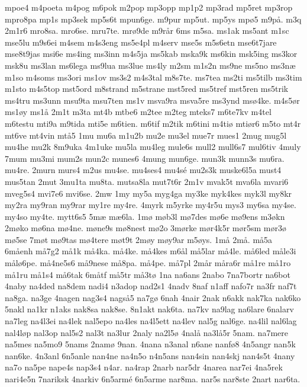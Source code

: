{mpoe4
m4poeta
m4pog
m6pok
m2pop
mp3opp
mp1p2
mp3rad
mp5ret
mp3rop
mpro8pa
mp1s
mp3sek
mp5s6t
mpun6ge.
m9pur
mp5ut.
mp5ys
mp^^f85
m9p^^e5.
m3q
2m1r6
mro8sa.
mro6se.
mru7te.
mr^^f89de
m9r^^e5r
6ms
m5sa.
ms1ak
ms5ant
m1sc
mse5lu
m9s6ei
m4sem
m4s3eng
ms5e4pl
m4serv
mse5s
m5s6etn
mse6t7jare
mse8t9jas
msi6e
ms4ing
ms3inn
m4s5ja
ms5kab
mska9k
ms6kin
msk5ing
ms3kor
msk8u
ms3lan
ms6lega
ms9lua
ms3lue
ms4ly
m2sm
m1s2n
ms9ne
ms5no
ms3n^^e6
m1so
m4soms
ms3ori
ms1ov
ms3s2
m4s3tal
m8s7te.
ms7tea
ms2ti
ms5tilb
ms3tim
m1sto
m4s5top
mst5ord
m8strand
m5strane
mst5red
ms5tref
mst5ren
ms5trik
ms4tru
ms3unn
msu9ta
msu7ten
ms1v
msva9ra
msva5re
ms3ynd
ms^^f84ke.
m4s5^^f8r
ms1^^f8y
ms1^^e5
2m1t
m3ta
mt4b
mtbe6
m2tee
m2teg
mteks7
m6te7kv
m4tel
m6testu
mti9a
m9tida
mti5e
m6tien.
m6tif
m2tik
m6tini
m4ti^^f8
mti^^f8r6
m5to
mt4r
mt6ve
mt4vin
mt^^e55
1mu
mu6a
m1u2b
mu2e
mu3el
mue7r
mues1
2mug
mug5l
mu4he
mu2k
8m9uka
4m1uke
mu5la
mu4leg
mule6s
mull2
mull6s7
mul6tiv
4muly
7mum
mu3mi
mum2s
mun2c
munes6
4mung
mun6ge.
mun3k
munn3s
mu6ra.
mu4re.
2murn
murs4
m2us
mu4se.
mu4ses4
mu4s^^e9
mu2s3k
muske6l5a
must4
mus5tan
2mut
3mu1ta
mu8ta.
mutsa8la
mut7t6r
2m1v
mvak5t
mva6la
mvari6
mveg5s4
mvi7e6
mvi6se.
2mw
1my
my5a
myg4ga
my3ke
myk4kes
myk3l
my8kr
my2ra
my9ran
my9rar
my1re
my4re.
4myrk
m5yrke
my4r5u
mys3
my6sa
my4se.
my4so
my4te.
mytt6s5
5m^^e6
m^^e66la.
1m^^f8
m^^f8b3l
m^^f87des
m^^f86e
m^^f89ens
m3^^f8kn
2m^^f8ko
m^^f86na
m^^f84ne.
m^^f8ne9s
m^^f88nest
m^^f82o
3m^^f8rke
m^^f8r4k5r
m^^f8r5sm
m^^f8r3^^f8
m^^f85se
7m^^f8t
m^^f89tas
m^^f84tere
m^^f8t9t
2m^^f8y
m^^f8y9ar
m5^^f8ys.
1m^^e5
2m^^e5.
m^^e55a
6m^^e5enh
m^^e57g2
m^^e51k
m^^e54ka.
m^^e54ke.
m^^e54kes
m6^^e5l
m^^e55lar
m^^e54le.
m^^e56led
m^^e5le3i
m^^e5l^^f86pe.
m^^e54ne5s6
m^^e59nese
m^^e58pa.
m^^e54pe.
m^^e57pl
2m^^e5r
m^^e5ra6r
m^^e51re
m^^e51ro
m^^e51ru
m^^e51s4
m^^e56tak
6m^^e5tf
m^^e55tr
m^^e53t^^f8
1na
na6ans
2nabo
7na7bortr
na6bot
4naby
na4ded
na8dem
nadi4
n3adop
nad2s1
4nadv
8naf
n1aff
nafo7r
na3fr
naf7t
na8ga.
na3ge
4nagen
nag3s4
nags^^e55
na7g^^f8
6nah
4nair
2nak
n6akk
nak7ka
nak6ko
5nakl
na1kr
n1aks
nak8sa
nak8se.
8n1akt
nak6ta.
na7kv
na9lag
na6lare
6nalarv
na7leg
na4l3ei
na4lek
nal5epo
na4les
na4l5ett
na4lev
nal5g
nal6ge.
na4lil
nal6lag
nal4l^^f8p
nal3op
nal5s2
nal3t
na3lur
2naly
na2l5^^f8
4nal^^e5
na3l^^e55r
5nam.
na7mere
na5mes
na5mo9
5nams
2nam^^f8
9nan.
4nana
n3anal
n6ane
nanf^^f88
4n5angr
nan5k
nan6ke.
4n3anl
6n5anle
nan4ne
na4n5o
n4n5ans
nan4sin
nan4skj
nan4s5t
4nany
na7o
na5pe
nape4s
nap3s4
n4ar.
na4rap
2narb
nar5dr
4narea
nar7ei
4na5rek
nari4e5n
7nariksk
4narkiv
6n5arm^^e9
6n5arme
nar8ma.
nar5s
nar8ste
2nart
nar6ta.
}
